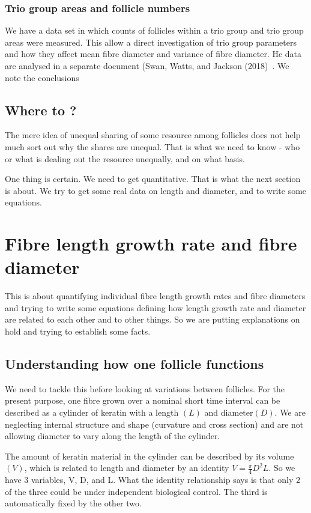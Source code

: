 \documentclass[titlepage]{article}  %
\begin{document}
\subsubsection{Trio group areas and follicle numbers}
We have a data set in which counts of follicles within a trio group and trio group areas were measured. This allow a direct investigation of trio group parameters and how they affect mean fibre diameter and variance of fibre diameter. He data are analysed in a separate document (Swan, Watts, and Jackson (2018)~\cite{swan:18}. We note the conclusions


\subsection{Where to ?}
The mere idea of unequal sharing of some resource among follicles does not help much sort out why the shares are unequal. That is what we need to know - who or what is dealing out the resource unequally, and on what basis.

One thing is certain. We need to get quantitative.  That is what the next section is about. We try to get some real data on length and diameter, and to write some equations.

\section{Fibre length growth rate and fibre diameter}
This is about quantifying individual fibre length growth rates and fibre diameters and trying to write some equations defining how length growth rate and diameter are related to each other and to other things. So we are putting explanations on hold and trying to establish some facts.

\subsection{Understanding how one follicle functions}
We need to tackle this before looking at variations between follicles. For the present purpose, one fibre grown over a nominal short time interval can be described as a cylinder of keratin with a length $(L)$ and diameter$(D)$. We are neglecting internal structure and shape (curvature and cross section) and are not allowing diameter to vary along the length of the cylinder. 

The amount of keratin material in the cylinder can be described by its volume $(V)$, which is related to length and diameter by an identity $V = \frac{\pi}{4} D^{2} L$. So we have 3 variables, V, D, and L. What the identity relationship says is that only 2 of the three could be under independent biological control.  The third is automatically fixed by the other two. 
\end{document}
